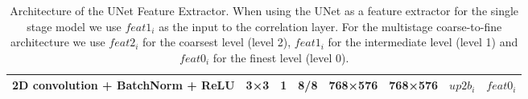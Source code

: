 \begin{table}[htbp]
\begin{adjustbox}{width=1\textwidth}
\begin{tabular}{|l|c|c|c|c|c|c|c|}
\hspace{0.75cm}2D convolution + BatchNorm + ReLU                           & 3×3             & 1               & 8/8            & 768×576         & 768×576         & $up2b_i$           & $feat0_i$          \\ \hline
\end{tabular}
\end{adjustbox}
\caption[Architecture of the UNet Feature Extractor.]{Architecture of the UNet Feature Extractor. When using the UNet as a feature extractor for the single stage {\mvsn} model we use $feat1_i$ as the input to the correlation layer. For the multistage coarse-to-fine architecture we use $feat2_i$ for the coarsest level (level 2), $feat1_i$ for the intermediate level (level 1) and  $feat0_i$ for the finest level (level 0).
}
\label{tab:arch-unet}
\end{table}